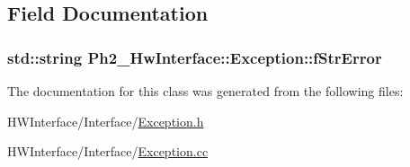 \subsection{Field Documentation}
\hypertarget{class_ph2___hw_interface_1_1_exception_aa060af06e0614e117e2902f41e57e179}{
\subsubsection[{f\-Str\-Error}]{\setlength{\rightskip}{0pt plus 5cm}std\-::string Ph2\-\_\-\-Hw\-Interface\-::\-Exception\-::f\-Str\-Error\hspace{0.3cm}{\ttfamily [private]}}}\label{class_ph2___hw_interface_1_1_exception_aa060af06e0614e117e2902f41e57e179}


The documentation for this class was generated from the following files\-:\begin{DoxyCompactItemize}
\item 
H\-W\-Interface/\-Interface/\hyperlink{_exception_8h}{Exception.\-h}\item 
H\-W\-Interface/\-Interface/\hyperlink{_exception_8cc}{Exception.\-cc}\end{DoxyCompactItemize}
